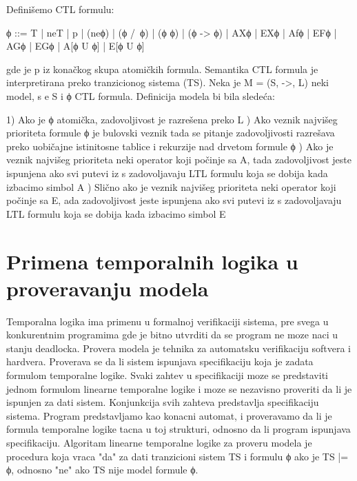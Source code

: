 \documentclass[a4paper]{article}
\begin{document}
	Definišemo CTL formulu:

	ϕ ::= T | neT | p | (neϕ) | (ϕ /\ ϕ) | (ϕ \/ ϕ) | (ϕ -> ϕ) | AXϕ | EXϕ | Afϕ | EFϕ | AGϕ | EGϕ | A[ϕ U ϕ] | E[ϕ U ϕ]

	gde je p iz konačkog skupa atomičkih formula.
	\newline
	\newline
	Semantika
	\newline
	\newline
	CTL formula je interpretirana preko tranzicionog sistema (TS). Neka je M = (S, ->, L) neki model, s e S i ϕ CTL formula.
	Definicija modela bi bila sledeća:

		1) Ako je ϕ atomička, zadovoljivost je razrešena preko L ) Ako veznik najvišeg prioriteta formule ϕ je bulovski veznik tada se pitanje zadovoljivosti razrešava
		   preko uobičajne istinitosne tablice i rekurzije nad drvetom formule ϕ ) Ako je veznik najvišeg prioriteta neki operator koji počinje sa A, tada zadovoljivost jeste ispunjena ako
		   svi putevi iz s zadovoljavaju LTL formulu koja se dobija kada izbacimo simbol A ) Slično ako je veznik najvišeg prioriteta neki operator koji počinje sa E, ada zadovoljivost jeste ispunjena ako
		   svi putevi iz s zadovoljavaju LTL formulu koja se dobija kada izbacimo simbol E \newline

	\newpage

	\section{Primena temporalnih logika u proveravanju modela}
	\label{sec:MC}

	Temporalna logika ima primenu u formalnoj verifikaciji sistema, pre svega u konkurentnim programima gde je bitno utvrditi da se program ne moze naci u stanju deadlocka. 
	Provera modela je tehnika za automatsku verifikaciju softvera i hardvera. Proverava se da li sistem ispunjava specifikaciju koja je zadata formulom temporalne logike. 
	Svaki zahtev u specifikaciji moze se predstaviti jednom formulom linearne temporalne logike i moze se nezavisno proveriti da li je ispunjen za dati sistem. Konjunkcija svih zahteva predstavlja specifikaciju sistema.
	Program predstavljamo kao konacni automat, i proveravamo da li je formula temporalne logike tacna u toj strukturi, odnosno da li program ispunjava specifikaciju.
	Algoritam linearne temporalne logike za proveru modela je procedura koja vraca "da" za dati tranzicioni sistem TS i formulu ϕ ako je TS |= ϕ, odnosno "ne" ako TS nije model formule ϕ.
\end{document}
